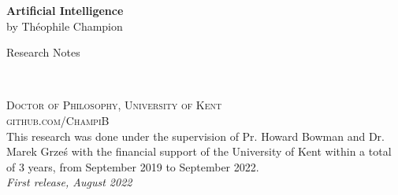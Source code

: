 \documentclass[11pt,fleqn]{book} %
\begin{document}

\begingroup
\thispagestyle{empty}
\centering
\vspace*{5cm}
\par\normalfont\fontsize{35}{35}\sffamily\selectfont
\textbf{Artificial Intelligence}\\
{\LARGE by Théophile Champion}\par %
\vspace*{1cm}
{\Huge Research Notes}\par %
\endgroup


\newpage
~\vfill
\thispagestyle{empty}


\noindent \textsc{Doctor of Philosophy, University of Kent}\\

\noindent \textsc{github.com/ChampiB}\\ %

\noindent This research was done under the supervision of Pr. Howard Bowman and Dr. Marek Grze\'s with the financial support of the University of Kent within a total of 3 years, from September 2019 to September 2022.\\

\noindent \textit{First release, August 2022} %



\pagestyle{empty} %

\tableofcontents %

\end{document}
